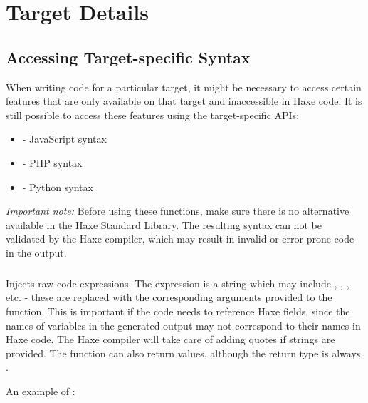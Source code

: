 \chapter{Target Details}
\label{target-details}

\section{Accessing Target-specific Syntax}
\label{target-syntax}

When writing code for a particular target, it might be necessary to access certain features that are only available on that target and inaccessible in Haxe code. It is still possible to access these features using the target-specific  APIs:

\begin{itemize}
	\item \href{https://api.haxe.org/v/development/js/Syntax.html}{} - JavaScript syntax
	\item \href{https://api.haxe.org/v/development/php/Syntax.html}{} - PHP syntax
	\item \href{https://api.haxe.org/v/development/python/Syntax.html}{} - Python syntax
\end{itemize}

\emph{Important note:} Before using these functions, make sure there is no alternative available in the Haxe Standard Library. The resulting syntax can not be validated by the Haxe compiler, which may result in invalid or error-prone code in the output.

\paragraph{}

Injects raw code expressions. The expression is a string which may include , , , etc. - these are replaced with the corresponding arguments provided to the function. This is important if the code needs to reference Haxe fields, since the names of variables in the generated output may not correspond to their names in Haxe code. The Haxe compiler will take care of adding quotes if strings are provided. The function can also return values, although the return type is always .

An example of :


